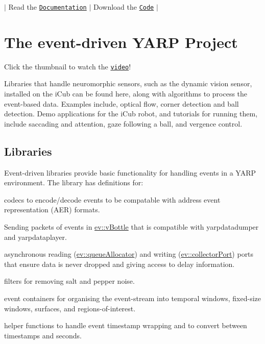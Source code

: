 $\vert$ Read the \href{http://robotology.github.io/event-driven/doxygen/doc/html/index.html}{\tt Documentation} $\vert$ Download the \href{https://github.com/robotology/event-driven}{\tt Code} $\vert$

\section*{The event-\/driven Y\+A\+RP Project}

\href{https://youtu.be/xS-7xYRYSLc}{\tt }  Click the thumbnail to watch the \href{https://youtu.be/xS-7xYRYSLc}{\tt video}!

Libraries that handle neuromorphic sensors, such as the dynamic vision sensor, installed on the i\+Cub can be found here, along with algorithms to process the event-\/based data. Examples include, optical flow, corner detection and ball detection. Demo applications for the i\+Cub robot, and tutorials for running them, include saccading and attention, gaze following a ball, and vergence control.

\subsection*{Libraries}

Event-\/driven libraries provide basic functionality for handling events in a Y\+A\+RP environment. The library has definitions for\+:
\begin{DoxyItemize}
\item codecs to encode/decode events to be compatable with address event representation (A\+ER) formats.
\item Sending packets of events in {\ttfamily \hyperlink{classev_1_1vBottle}{ev\+::v\+Bottle}} that is compatible with yarpdatadumper and yarpdataplayer.
\item asynchronous reading ({\ttfamily \hyperlink{classev_1_1queueAllocator}{ev\+::queue\+Allocator}}) and writing ({\ttfamily \hyperlink{classev_1_1collectorPort}{ev\+::collector\+Port}}) ports that ensure data is never dropped and giving access to delay information.
\item filters for removing salt and pepper noise.
\item event containers for organising the event-\/stream into temporal windows, fixed-\/size windows, surfaces, and regions-\/of-\/interest.
\item helper functions to handle event timestamp wrapping and to convert between timestamps and seconds.
\end{DoxyItemize}

